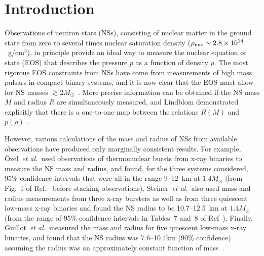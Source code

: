 \documentclass[twocolumn,prd,amssymb,aps,nofootinbib,showpacs,epsf]{revtex4}
\begin{document}
\maketitle


\section{Introduction}

Observations of neutron stars (NSs), consisting of nuclear matter in the ground state from zero to several times nuclear saturation density ($\rho_{\rm nuc}\sim2.8\times 10^{14}$~g/cm$^3$), in principle provide an ideal way to measure the nuclear equation of state (EOS) that describes the pressure $p$ as a function of density $\rho$. The most rigorous EOS constraints from NSs have come from measurements of high mass pulsars in compact binary systems, and it is now clear that the EOS must allow for NS masses $\gtrsim 2 M_\odot$~\cite{DemorestPennucciRansom2010, AntoniadisFreireWex2013}. More precise information can be obtained if the NS mass $M$ and radius $R$ are simultaneously measured, and Lindblom demonstrated explicitly that there is a one-to-one map between the relations $R(M)$ and $p(\rho)$~\cite{Lindblom1992}. 

However, various calculations of the mass and radius of NSs from available observations have produced only marginally consistent results. For example, \"Ozel~{\it et al.}\ used observations of thermonuclear bursts from x-ray binaries to measure the NS mass and radius, and found, for the three systems considered, 95\% confidence intervals that were all in the range 9--12~km at $1.4M_\odot$ (from Fig.~1 of Ref.~\cite{OzelBaymGuver2010} before stacking observations). Steiner~{\it et al.}\ also used mass and radius measurements from three x-ray bursters as well as from three quiescent low-mass x-ray binaries and found the NS radius to be 10.7--12.5~km at $1.4M_\odot$ (from the range of 95\% confidence intervals in Tables~7 and~8 of Ref~\cite{SteinerLattimerBrown2010}). Finally, Guillot~{\it et al.}\ measured the mass and radius for five quiescent low-mass x-ray binaries, and found that the NS radius was 7.6--10.4km (90\% confidence) assuming the radius was an approximately constant function of mass~\cite{GuillotServillatWebb2013}.
\end{document}
